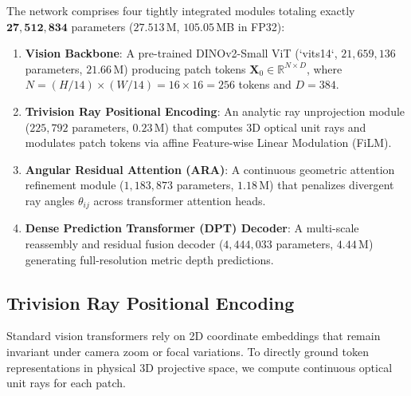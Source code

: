 The network comprises four tightly integrated modules totaling exactly $\mathbf{27,512,834}$ parameters ($27.513$\,M, $105.05$\,MB in FP32):
\begin{enumerate}
    \item \textbf{Vision Backbone}: A pre-trained DINOv2-Small ViT (`vits14`, $21,659,136$ parameters, $21.66$\,M) producing patch tokens $\mathbf{X}_0 \in \mathbb{R}^{N \times D}$, where $N = (H / 14) \times (W / 14) = 16 \times 16 = 256$ tokens and $D = 384$.
    \item \textbf{Trivision Ray Positional Encoding}: An analytic ray unprojection module ($225,792$ parameters, $0.23$\,M) that computes 3D optical unit rays and modulates patch tokens via affine Feature-wise Linear Modulation (FiLM).
    \item \textbf{Angular Residual Attention (ARA)}: A continuous geometric attention refinement module ($1,183,873$ parameters, $1.18$\,M) that penalizes divergent ray angles $\theta_{ij}$ across transformer attention heads.
    \item \textbf{Dense Prediction Transformer (DPT) Decoder}: A multi-scale reassembly and residual fusion decoder ($4,444,033$ parameters, $4.44$\,M) generating full-resolution metric depth predictions.
\end{enumerate}

\subsection{Trivision Ray Positional Encoding}
Standard vision transformers rely on 2D coordinate embeddings that remain invariant under camera zoom or focal variations. To directly ground token representations in physical 3D projective space, we compute continuous optical unit rays for each patch.

